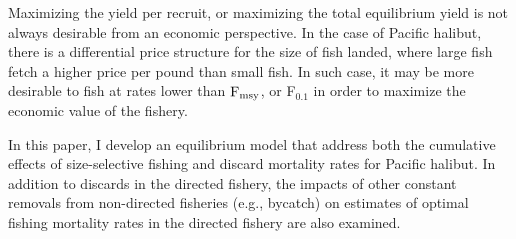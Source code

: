 Maximizing the yield per recruit, or maximizing the total equilibrium yield is not always desirable from an economic perspective.  In the case of Pacific halibut, there is a differential price structure for the size of fish landed, where large fish fetch a higher price per pound  than small fish. In such case, it may be more desirable to fish at rates lower than $\rm{F_{msy}}$, or F$_{0.1}$ in order to maximize the economic value of the fishery.

In this paper, I develop an equilibrium model that address both the cumulative effects of size-selective fishing and discard mortality rates for Pacific halibut. In addition to discards in the directed fishery, the impacts of other constant removals from non-directed fisheries (e.g., bycatch) on estimates of optimal fishing mortality rates in the directed fishery are also examined.





